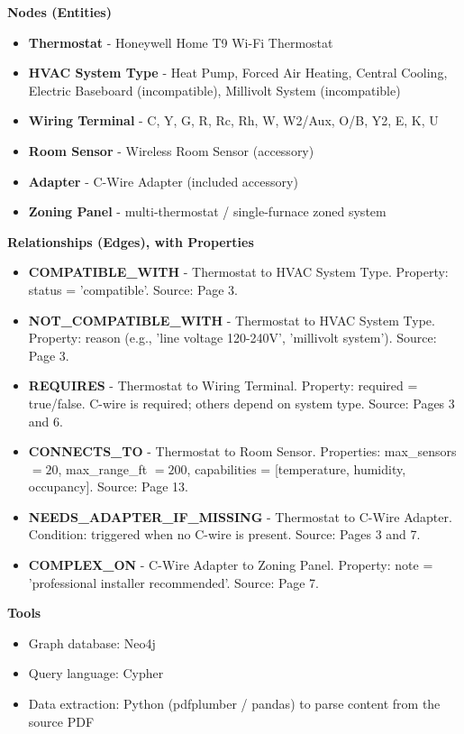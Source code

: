 \documentclass[11pt,a4paper]{article}
\begin{document}
\textbf{Nodes (Entities)}
\begin{itemize}
    \item \textbf{Thermostat} - Honeywell Home T9 Wi-Fi Thermostat
    \item \textbf{HVAC System Type} - Heat Pump, Forced Air Heating, Central Cooling, Electric Baseboard (incompatible), Millivolt System (incompatible)
    \item \textbf{Wiring Terminal} - C, Y, G, R, Rc, Rh, W, W2/Aux, O/B, Y2, E, K, U
    \item \textbf{Room Sensor} - Wireless Room Sensor (accessory)
    \item \textbf{Adapter} - C-Wire Adapter (included accessory)
    \item \textbf{Zoning Panel} - multi-thermostat / single-furnace zoned system
\end{itemize}

\textbf{Relationships (Edges), with Properties}
\begin{itemize}
    \item \textbf{COMPATIBLE\_WITH} - Thermostat to HVAC System Type. Property: status = 'compatible'. Source: Page 3.
    \item \textbf{NOT\_COMPATIBLE\_WITH} - Thermostat to HVAC System Type. Property: reason (e.g., 'line voltage 120-240V', 'millivolt system'). Source: Page 3.
    \item \textbf{REQUIRES} - Thermostat to Wiring Terminal. Property: required = true/false. C-wire is required; others depend on system type. Source: Pages 3 and 6.
    \item \textbf{CONNECTS\_TO} - Thermostat to Room Sensor. Properties: max\_sensors $=20$, max\_range\_ft $=200$, capabilities = [temperature, humidity, occupancy]. Source: Page 13.
    \item \textbf{NEEDS\_ADAPTER\_IF\_MISSING} - Thermostat to C-Wire Adapter. Condition: triggered when no C-wire is present. Source: Pages 3 and 7.
    \item \textbf{COMPLEX\_ON} - C-Wire Adapter to Zoning Panel. Property: note = 'professional installer recommended'. Source: Page 7.
\end{itemize}

\textbf{Tools}
\begin{itemize}
    \item Graph database: Neo4j
    \item Query language: Cypher
    \item Data extraction: Python (pdfplumber / pandas) to parse content from the source PDF
\end{itemize}
\end{document}
